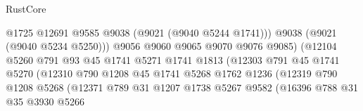 \begin{lexlean}{RustCore}
\begin{coremodule}
                                            @1725
                                            @12691
                                            @9585
                                            @9038
                                            (@9021 (@9040 @5244 @1741)))
                                          @9038
                                          (@9021 (@9040 @5234 @5250)))
                                        @9056
                                        @9060
                                        @9065
                                        @9070
                                        @9076
                                        @9085)
                                      (@12104
                                        @5260
                                        @791
                                        @93
                                        @45
                                        @1741
                                        @5271
                                        @1741
                                        @1813
                                        (@12303
                                          @791
                                          @45
                                          @1741
                                          @5270
                                          (@12310
                                            @790
                                            @1208
                                            @45
                                            @1741
                                            @5268
                                            @1762
                                            @1236
                                            (@12319
                                              @790
                                              @1208
                                              @5268
                                              (@12371
                                                @789
                                                @31
                                                @1207
                                                @1738
                                                @5267
                                                @9582
                                                (@16396
                                                  @788
                                                  @31
                                                  @35
                                                  @3930
                                                  @5266

\end{coremodule}
\end{lexlean}
